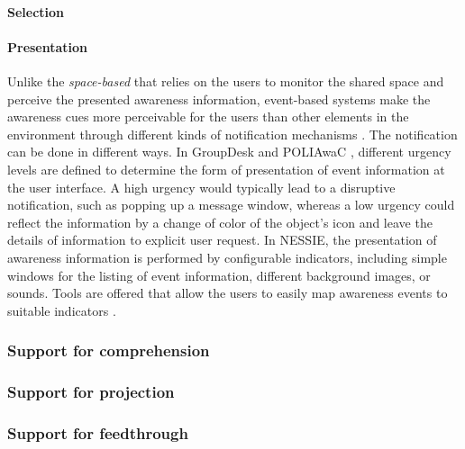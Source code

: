 \paragraph*{Selection} %
\label{par:selection}


\paragraph*{Presentation} %
\label{par:presentation}
Unlike the \emph{space-based} that relies on the users to monitor the shared space and perceive the presented awareness information, event-based systems make the awareness cues more perceivable for the users than other elements in the environment through different kinds of notification mechanisms \cite{McCrickard2003}. The notification can be done in different ways. In GroupDesk \cite{Fuchs1995} and POLIAwaC \cite{sohlenkamp2000po}, different urgency levels are defined to determine the form of presentation of event information at the user interface. A high urgency would typically lead to a disruptive notification, such as popping up a message window, whereas a low urgency could reflect the information by a change of color of the object's icon and leave the details of information to explicit user request. In NESSIE, the presentation of awareness information is performed by configurable indicators, including simple windows for the listing of event information, different background images, or sounds. Tools are offered that allow the users to easily map awareness events to suitable indicators \cite{prinz1999a}.

\subsubsection{Support for comprehension} %
\label{ssub:support_for_comprehension}
\subsubsection{Support for projection} %
\label{ssub:support_for_projection}


\subsubsection{Support for feedthrough} %
\label{ssub:support_for_feedthrough}


